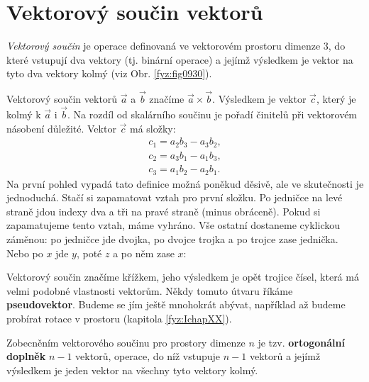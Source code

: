   \section{Vektorový součin vektorů}\label{fyz:IchapXIsecVII} 
    \emph{Vektorový součin} je operace definovaná ve vektorovém prostoru dimenze 3, do které
    vstupují dva vektory (tj. binární operace) a jejímž výsledkem je vektor na tyto dva vektory
    kolmý (viz Obr. \ref{fyz:fig0930}).


    Vektorový součin vektorů \(\vec{a}\) a \(\vec{b}\) značíme \(\vec{a}\times\vec{b}\). Výsledkem
    je vektor \(\vec{c}\), který je kolmý k \(\vec{a}\) i \(\vec{b}\). Na rozdíl od skalárního
    součinu je pořadí činitelů při vektorovém násobení důležité. Vektor \(\vec{c}\) má složky: 
    \begin{subequations}\label{fyz:eq752}
      \begin{align}
        c_1 =a_2b_3−a_3b_2,    \label{fyz:eq752a}  \\
        c_2 =a_3b_1−a_1b_3,    \label{fyz:eq752b}  \\
        c_3 =a_1b_2−a_2b_1.    \label{fyz:eq752c}
      \end{align}
    \end{subequations}
    Na první pohled vypadá tato definice možná poněkud děsivě, ale ve skutečnosti je jednoduchá.
    Stačí si zapamatovat vztah pro první složku. Po jedničce na levé straně jdou indexy dva a tři na
    pravé straně (minus obráceně). Pokud si zapamatujeme tento vztah, máme vyhráno. Vše ostatní
    dostaneme cyklickou záměnou: po jedničce jde dvojka, po dvojce trojka a po trojce zase jednička.
    Nebo po \(x\) jde \(y\), poté \(z\) a po něm zase \(x\): 


    Vektorový součin značíme křížkem, jeho výsledkem je opět trojice čísel, která má velmi podobné
    vlastnosti vektorům. Někdy tomuto útvaru říkáme \textbf{pseudovektor}. Budeme se jím ještě
    mnohokrát abývat, například až budeme probírat rotace v prostoru (kapitola \ref{fyz:IchapXX}).

    Zobecněním vektorového součinu pro prostory dimenze \(n\) je tzv. \textbf{ortogonální doplněk}
    \(n-1\) vektorů, operace, do níž vstupuje \(n − 1\) vektorů a jejímž výsledkem je jeden vektor
    na všechny tyto vektory kolmý.

